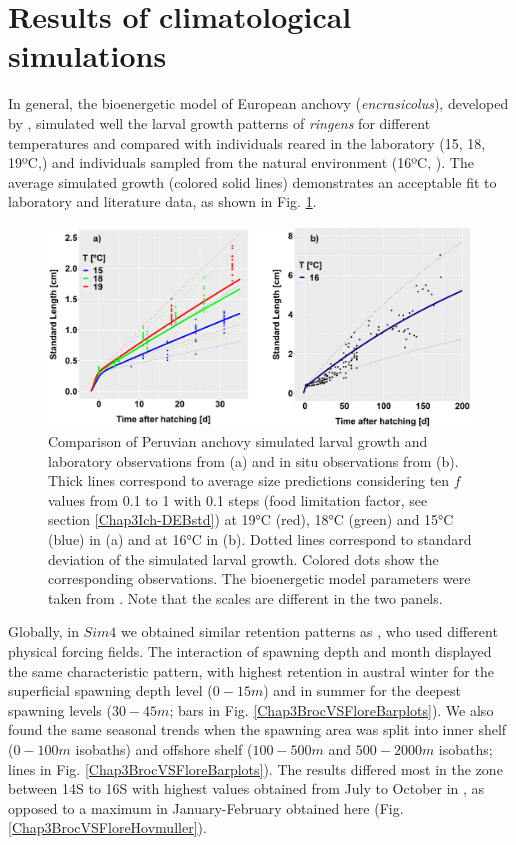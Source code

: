 \clearpage
\section{Results of climatological simulations}\label{Chap3Resu1}

In general, the bioenergetic model of European anchovy (\textit{\gls{encrasicolus}}), developed by \cite{PethRoos2013}, simulated well the larval growth patterns of \textit{\gls{ringens}} for different temperatures and compared with individuals reared in the laboratory (15, 18, 19ºC,\cite{RiouOfel2021}) and individuals sampled from the natural environment (16ºC, \cite{MoreClar2011}). The average simulated growth (colored solid lines) demonstrates an acceptable fit to laboratory and literature data, as shown in Fig. \ref{Chap3DEBvsData}.

\begin{figure}[H]
	\includegraphics[width=1.0\textwidth]{figures/Chap3DEBvsData.png}
	\centering
	\caption{Comparison of Peruvian anchovy simulated larval growth and laboratory
observations from \cite{RiouOfel2021} (a) and in situ observations from \cite{MoreClar2011}
(b). Thick lines correspond to average size predictions considering ten $f$ values from 0.1 to 1
with 0.1 steps (food limitation factor, see section \ref{Chap3Ich-DEBstd}) at 19°C (red), 18°C (green) and 15°C (blue) in (a) and at 16°C in (b). Dotted lines correspond to standard deviation of the simulated larval growth. Colored dots show the corresponding observations. The bioenergetic model
parameters were taken from \cite{PethRoos2013}. Note that the scales are different in the
two panels.}
	\label{Chap3DEBvsData}
\end{figure}

Globally, in $Sim 4$ we obtained similar retention patterns as \cite{BrocLett2008}, who used different physical forcing fields. The interaction of spawning depth and month displayed the same characteristic pattern, with highest retention in austral winter for the superficial spawning depth level ($0 - 15 m$) and in summer for the deepest spawning levels ($30 - 45 m$; bars in Fig. \ref{Chap3BrocVSFloreBarplots}). We also found the same seasonal trends when the spawning area was split into inner shelf ($0 - 100 m$ isobaths) and offshore shelf ($100 - 500 m$ and $500 - 2000 m$ isobaths; lines in Fig. \ref{Chap3BrocVSFloreBarplots}). The results differed most in the zone between 14\textdegree S to 16\textdegree S with highest values obtained from July to October in \cite{BrocLett2008}, as opposed to a maximum in January-February obtained here (Fig. \ref{Chap3BrocVSFloreHovmuller}).\\


